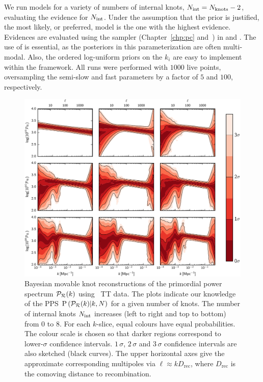 We run models for a variety of numbers of internal knots, \(N_\mathrm{int} =N_\mathrm{knots} -2\), evaluating the evidence for \(N_\mathrm{int}\).  Under the assumption that the prior is justified, the most likely, or preferred, model is the one with the highest evidence.  Evidences are evaluated using the \PolyChord{} sampler (Chapter~\ref{chp:pc} and~\citealp{polychordletter,polychordpaper}) in \CAMB{} and \CosmoMC{}. The use of \PolyChord{} is essential, as the posteriors in this parameterization are often multi-modal. Also, the ordered log-uniform priors on the \(k_i\) are easy to implement within the \PolyChord{} framework. All runs were performed with \(1000\) live points, oversampling the semi-slow and fast parameters by a factor of \(5\) and \(100\), respectively.

\begin{figure}[tp]
  \includegraphics[width=\textwidth]{chapters/pps_reconstruction/figures/array}
  \caption{Bayesian movable knot reconstructions of the primordial power spectrum \(\mathcal{P}_{\mathcal{R}}(k)\) using \Planck\ TT data.  The plots indicate our knowledge of the PPS \(\mathrm{P}\left(\mathcal{P}_{\mathcal{R}}(k)\middle|k,N\right)\) for a given number of knots.  The number of internal knots \(N_\mathrm{int}\) increases (left to right and top to bottom) from \(0\) to \(8\).  For each \(k\)-slice, equal colours have equal probabilities. The colour scale is chosen so that darker regions correspond to lower-\(\sigma\) confidence intervals.  \(1\,\sigma\), \(2\,\sigma \) and \(3\,\sigma \) confidence intervals are also sketched (black curves).  The upper horizontal axes give the approximate corresponding multipoles via \(\ell \approx kD_\mathrm{rec}\), where \(D_\mathrm{rec}\) is the comoving distance to recombination.}\label{fig:Pkr0}
\end{figure}


